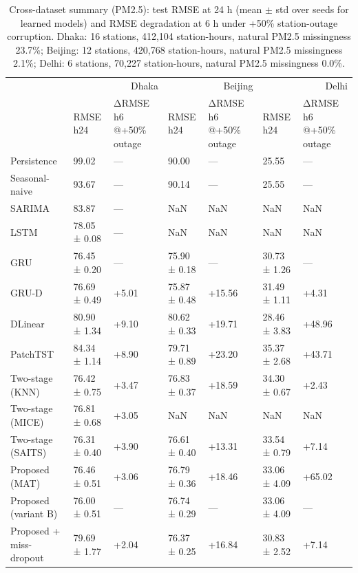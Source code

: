 \begin{table}
\caption{Cross-dataset summary (PM2.5): test RMSE at 24 h (mean $\pm$ std over seeds for learned models) and RMSE degradation at 6 h under +50\% station-outage corruption. Dhaka: 16 stations, 412,104 station-hours, natural PM2.5 missingness 23.7\%; Beijing: 12 stations, 420,768 station-hours, natural PM2.5 missingness 2.1\%; Delhi: 6 stations, 70,227 station-hours, natural PM2.5 missingness 0.0\%.}
\label{tab:cross_dataset}
\begin{tabular}{lllllll}
\toprule
 & \multicolumn{2}{r}{Dhaka} & \multicolumn{2}{r}{Beijing} & \multicolumn{2}{r}{Delhi} \\
 & RMSE h24 & ΔRMSE h6 @+50\% outage & RMSE h24 & ΔRMSE h6 @+50\% outage & RMSE h24 & ΔRMSE h6 @+50\% outage \\
\midrule
Persistence & 99.02 & — & 90.00 & — & 25.55 & — \\
Seasonal-naive & 93.67 & — & 90.14 & — & 25.55 & — \\
SARIMA & 83.87 & — & NaN & NaN & NaN & NaN \\
LSTM & 78.05 ± 0.08 & — & NaN & NaN & NaN & NaN \\
GRU & 76.45 ± 0.20 & — & 75.90 ± 0.18 & — & 30.73 ± 1.26 & — \\
GRU-D & 76.69 ± 0.49 & +5.01 & 75.87 ± 0.48 & +15.56 & 31.49 ± 1.11 & +4.31 \\
DLinear & 80.90 ± 1.34 & +9.10 & 80.62 ± 0.33 & +19.71 & 28.46 ± 3.83 & +48.96 \\
PatchTST & 84.34 ± 1.14 & +8.90 & 79.71 ± 0.89 & +23.20 & 35.37 ± 2.68 & +43.71 \\
Two-stage (KNN) & 76.42 ± 0.75 & +3.47 & 76.83 ± 0.37 & +18.59 & 34.30 ± 0.67 & +2.43 \\
Two-stage (MICE) & 76.81 ± 0.68 & +3.05 & NaN & NaN & NaN & NaN \\
Two-stage (SAITS) & 76.31 ± 0.40 & +3.90 & 76.61 ± 0.40 & +13.31 & 33.54 ± 0.79 & +7.14 \\
Proposed (MAT) & 76.46 ± 0.51 & +3.06 & 76.79 ± 0.36 & +18.46 & 33.06 ± 4.09 & +65.02 \\
Proposed (variant B) & 76.00 ± 0.51 & — & 76.74 ± 0.29 & — & 33.06 ± 4.09 & — \\
Proposed + miss-dropout & 79.69 ± 1.77 & +2.04 & 76.37 ± 0.25 & +16.84 & 30.83 ± 2.52 & +7.14 \\
\bottomrule
\end{tabular}
\end{table}
